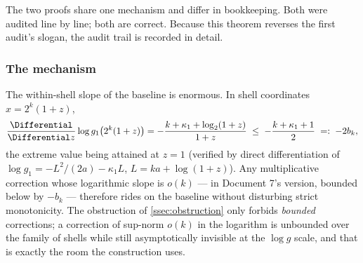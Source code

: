 \documentclass[11pt,oneside]{article}
\theoremstyle{definition}
\theoremstyle{remark}
\begin{document}
The two proofs share one mechanism and differ in bookkeeping.  Both
were audited line by line; both are correct.  Because this theorem
reverses the first audit's slogan, the audit trail is recorded in
detail.

\subsubsection*{The mechanism}

The within-shell slope of the baseline is enormous.  In shell
coordinates $x=2^k(1+z)$,
\begin{equation}
 \frac{\Differential}{\Differential z}\log g_1\bigl(2^k(1+z)\bigr)
 =-\frac{k+\kappa_1+\log_2(1+z)}{1+z}
 \;\le\;-\frac{k+\kappa_1+1}{2}
 \;=:\;-2b_k,
 \label{eq:baseline-slope}
\end{equation}
the extreme value being attained at $z=1$ (verified by direct
differentiation of $\log g_1=-L^2/(2a)-\kappa_1L$,
$L=ka+\log(1+z)$).  Any multiplicative correction whose logarithmic
slope is $o(k)$ --- in Document 7's version, bounded below by $-b_k$
--- therefore rides on the baseline without disturbing strict
monotonicity.  The obstruction of \cref{ssec:obstruction} only forbids
\emph{bounded} corrections; a correction of sup-norm $o(k)$ in the
logarithm is unbounded over the family of shells while still
asymptotically invisible at the $\log g$ scale, and that is exactly the
room the construction uses.
\end{document}
